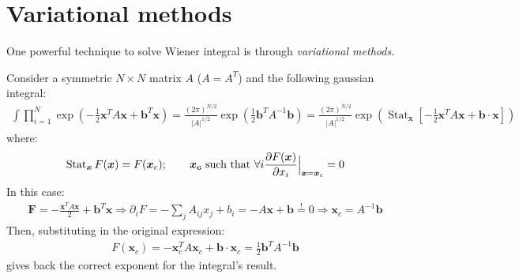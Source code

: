 \documentclass[../template.tex]{subfiles}
\begin{document}
\section{Variational methods}
One powerful technique to solve Wiener integral is through \textit{variational methods}. 

Consider a symmetric $N\times N$ matrix $A$ ($A = A^T$) and the following gaussian integral:
\begin{align*}
    \int \prod_{i=1}^N \exp\left(-\frac{1}{2} \bm{x}^T A \bm{x} + \bm{b}^T \bm{x}  \right) = \frac{(2 \pi)^{N/2}}{|A|^{1/2}} \exp\left(\frac{1}{2} \bm{b}^T A^{-1} \bm{b} \right) = \frac{(2\pi)^{N/2}}{|A|^{1/2}} \exp\left(\operatorname{Stat}_{\bm{x}} \left[-\frac{1}{2} \bm{x}^T A \bm{x} + \bm{b} \cdot \bm{x} \right] \right) 
\end{align*}
where:
\begin{align*}
    \operatorname{Stat}_{\bm{x}} F(\bm{x}) = F(\bm{x}_c); \qquad \bm{x_c} \text{ such that } \forall i \pdv{F(\bm{x})}{x_i} \Big|_{\bm{x} = \bm{x}_c} = 0
\end{align*}
In this case:
\begin{align*}
    \bm{F} = -\frac{\bm{x}^T A \bm{x}}{2} + \bm{b}^T \bm{x} \Rightarrow \partial_i F = - \sum_{j} A_{ij} x_j + b_i = - A\bm{x} + \bm{b} \overset{!}{=}  0 \Rightarrow\bm{x}_c = A^{-1}\bm{b}  
\end{align*}
Then, substituting in the original expression:
\begin{align*}
    F(\bm{x}_c) = - \bm{x}_c^T A \bm{x}_c + \bm{b} \cdot \bm{x}_c = \frac{1}{2} \bm{b}^T A^{-1} \bm{b}
\end{align*}
gives back the correct exponent for the integral's result.
\end{document}
